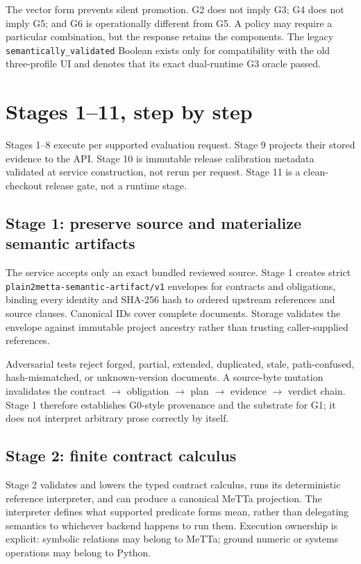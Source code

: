 \documentclass[11pt]{article}
\newcommand{\code}[1]{\texttt{#1}}
\begin{document}
The vector form prevents silent promotion.  G2 does not imply G3; G4 does not
imply G5; and G6 is operationally different from G5.  A policy may require a
particular combination, but the response retains the components.  The legacy
\code{semantically\_validated} Boolean exists only for compatibility with the
old three-profile UI and denotes that its exact dual-runtime G3 oracle passed.

\section{Stages 1--11, step by step}

Stages 1--8 execute per supported evaluation request.  Stage 9 projects their
stored evidence to the API.  Stage 10 is immutable release calibration
metadata validated at service construction, not rerun per request.  Stage 11
is a clean-checkout release gate, not a runtime stage.

\subsection{Stage 1: preserve source and materialize semantic artifacts}

The service accepts only an exact bundled reviewed source.  Stage 1 creates
strict \code{plain2metta-semantic-artifact/v1} envelopes for contracts and
obligations, binding every identity and SHA-256 hash to ordered upstream
references and source clauses.  Canonical IDs cover complete documents.
Storage validates the envelope against immutable project ancestry rather than
trusting caller-supplied references.

Adversarial tests reject forged, partial, extended, duplicated, stale,
path-confused, hash-mismatched, or unknown-version documents.  A source-byte
mutation invalidates the contract $\rightarrow$ obligation $\rightarrow$ plan
$\rightarrow$ evidence $\rightarrow$ verdict chain.  Stage 1 therefore
establishes G0-style provenance and the substrate for G1; it does not interpret
arbitrary prose correctly by itself.

\subsection{Stage 2: finite contract calculus}

Stage 2 validates and lowers the typed contract calculus, runs its
deterministic reference interpreter, and can produce a canonical MeTTa
projection.  The interpreter defines what supported predicate forms mean,
rather than delegating semantics to whichever backend happens to run them.
Execution ownership is explicit: symbolic relations may belong to MeTTa;
ground numeric or systems operations may belong to Python.
\end{document}
